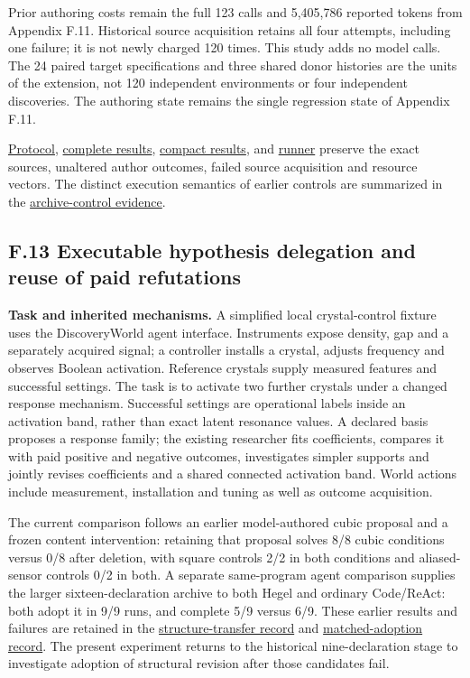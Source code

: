 \documentclass[11pt,a4paper]{article}
\begin{document}
Prior authoring costs remain the full 123 calls and 5,405,786 reported tokens from Appendix F.11. Historical source acquisition retains all four attempts, including one failure; it is not newly charged 120 times. This study adds no model calls. The 24 paired target specifications and three shared donor histories are the units of the extension, not 120 independent environments or four independent discoveries. The authoring state remains the single regression state of Appendix F.11.


\hyperlink{artifact-100}{Protocol}, \hyperlink{artifact-101}{complete results}, \hyperlink{artifact-102}{compact results}, and \hyperlink{artifact-103}{runner} preserve the exact sources, unaltered author outcomes, failed source acquisition and resource vectors. The distinct execution semantics of earlier controls are summarized in the \hyperlink{artifact-104}{archive-control evidence}.


\subsection*{F.13 Executable hypothesis delegation and reuse of paid refutations}

\textbf{Task and inherited mechanisms.} A simplified local crystal-control fixture uses the DiscoveryWorld agent interface. Instruments expose density, gap and a separately acquired signal; a controller installs a crystal, adjusts frequency and observes Boolean activation. Reference crystals supply measured features and successful settings. The task is to activate two further crystals under a changed response mechanism. Successful settings are operational labels inside an activation band, rather than exact latent resonance values. A declared basis proposes a response family; the existing researcher fits coefficients, compares it with paid positive and negative outcomes, investigates simpler supports and jointly revises coefficients and a shared connected activation band. World actions include measurement, installation and tuning as well as outcome acquisition.


The current comparison follows an earlier model-authored cubic proposal and a frozen content intervention: retaining that proposal solves 8/8 cubic conditions versus 0/8 after deletion, with square controls 2/2 in both conditions and aliased-sensor controls 0/2 in both. A separate same-program agent comparison supplies the larger sixteen-declaration archive to both Hegel and ordinary Code/ReAct: both adopt it in 9/9 runs, and complete 5/9 versus 6/9. These earlier results and failures are retained in the \hyperlink{artifact-105}{structure-transfer record} and \hyperlink{artifact-106}{matched-adoption record}. The present experiment returns to the historical nine-declaration stage to investigate adoption of structural revision after those candidates fail.
\end{document}
